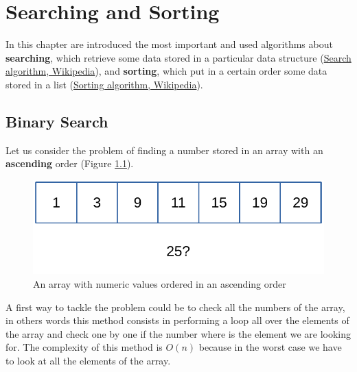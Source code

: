 \chapter{Searching and Sorting}
\label{chp: searchandsorting}
In this chapter are introduced the most important and used algorithms about \textbf{searching}, which retrieve some data stored in a particular data structure \cite{wikisearch} (\href{https://en.wikipedia.org/wiki/Search_algorithm}{Search algorithm, Wikipedia}), and \textbf{sorting}, which put in a certain order some data stored in a list \cite{wikisorting} (\href{https://en.wikipedia.org/wiki/Sorting_algorithm}{Sorting algorithm, Wikipedia}).
\section{Binary Search}
Let us consider the problem of finding a number stored in an array with an \textbf{ascending} order (Figure \ref{sorting_1}).

\begin{figure}[H]
	\begin{center}
		\includegraphics[scale=.6]{chapters/searchandsorting/images/sorting_1.pdf}
		\caption[An array with numeric values ordered in an ascending order]{An array with numeric values ordered in an ascending order}
		\label{sorting_1}
	\end{center}
\end{figure}

A first way to tackle the problem could be to check all the numbers of the array, in others words this method consists in performing a loop all over the elements of the array and check one by one if the number where is the element we are looking for. The complexity of this method is \(O(n)\) because in the worst case we have to look at all the elements of the array. 

